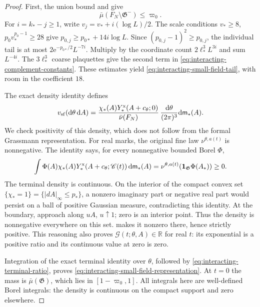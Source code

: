 \documentclass[11pt,letterpaper,reqno]{amsart}
\newcommand{\R}{\mathbb R}
\newcommand{\dd}{\mathrm d}
\begin{document}
\begin{proof}
First, the union bound and
\cite[(7)]{TerminalPressure} give
\begin{equation}\label{eq:interacting-small-field-tail}
 \bar\mu(F_N\setminus\mathfrak G^-)\le\varpi_0 .
\end{equation}
For $i=k_*-j\ge1$, write
$v_j=v_*+i(\log L)/2$.
The scale conditions
$v_*\ge8$, $p_0v_*^{p_0-1}\ge28$ give
$p_{0,j}\ge p_{0*}+14i\log L$.
Since $(p_{0,j}-1)^2\ge p_{0,j}$,
the individual tail is at most
$2\mathrm e^{-p_{0*}/2}L^{-7i}$.
Multiply by the coordinate count
$2\ell_*^3L^{3i}$ and sum $L^{-4i}$.
The $3\ell_*^3$ coarse plaquettes give the
second term in \eqref{eq:interacting-complement-constants}.
These estimates yield \eqref{eq:interacting-small-field-tail},
with room in the coefficient $18$.

The exact density identity defines
\begin{equation}\label{eq:interacting-small-field-measure}
 v_{\rm sf}(\dd\theta\,\dd A)=
   \frac{\chi_*(A)Y_*^{\rm x}(A+c_\theta;0)}
             {\bar\nu(F_N)}\,\frac{\dd\theta}{(2\pi)^3}
                                      \dd\mathsf m_*(A).
\end{equation}
We check positivity of this density, which
does not follow from the formal Grassmann
representation. For real marks, the original
fine law $\nu^{\theta,a(t)}$ is nonnegative.
The identity \cite[(21)]{TerminalPressure} says, for every
nonnegative bounded Borel $\Phi$,
\[
 \int\Phi(A)\chi_*(A)Y_*^{\rm x}(A+c_\theta;\mathscr C(t))
                \,\dd\mathsf m_*(A)
       =\nu^{\theta,a(t)}(\mathbf1_{\mathfrak G}\Phi(A_*))\ge0.
\]
The terminal density is continuous. On the
interior of the compact convex set
$\{\chi_*=1\}=\{|dA|_\infty\le p_*\}$, a
nonzero imaginary part or negative real
part would persist on a ball of positive
Gaussian measure, contradicting this identity.
At the boundary, approach along $uA$,
$u\uparrow1$; zero is an interior point.
Thus the density is nonnegative everywhere
on this set. 
makes it nonzero there, hence strictly positive.
This reasoning also proves
$\mathcal G(t;\theta,A)\in\R$ for real $t$:
its exponential is a positive ratio and its
continuous value at zero is zero.

Integration of the exact terminal identity over
$\theta$, followed by
\eqref{eq:interacting-terminal-ratio}, proves
\eqref{eq:interacting-small-field-representation}.
At $t=0$ the mass is $\bar\mu(\mathfrak G)$,
which lies in $[1-\varpi_0,1]$.
All integrals here are well-defined Borel
integrals: the density is continuous on
the compact support and zero elsewhere.


\end{proof}
\end{document}

